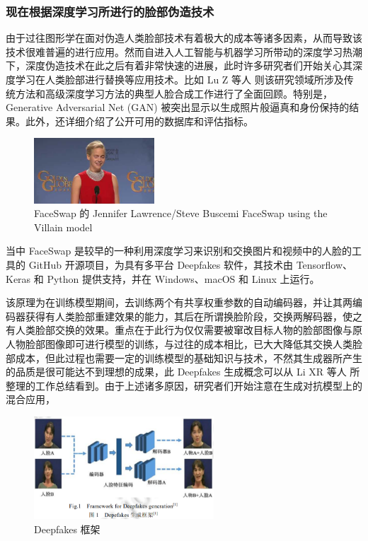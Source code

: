 \subsubsection{现在根据深度学习所进行的脸部伪造技术}

由于过往图形学在面对伪造人类脸部技术有着极大的成本等诸多因素，从而导致该技术很难普遍的进行应用。然而自进入人工智能与机器学习所带动的深度学习热潮下，深度伪造技术在此之后有着非常快速的进展，此时许多研究者们开始关心其深度学习在人类脸部进行替换等应用技术。比如 Lu Z 等人 \cite{lu2017recent}则该研究领域所涉及传统方法和高级深度学习方法的典型人脸合成工作进行了全面回顾。特别是，Generative Adversarial Net (GAN) 被突出显示以生成照片般逼真和身份保持的结果。此外，还详细介绍了公开可用的数据库和评估指标。

\begin{figure}[htb]
\centering 
\includegraphics[width=0.40\textwidth]{img/ch1m7.png} 
\caption{FaceSwap 的 Jennifer Lawrence/Steve Buscemi FaceSwap using the Villain model}
\label{Test}
\end{figure}

当中 FaceSwap \cite{list1101} 是较早的一种利用深度学习来识别和交换图片和视频中的人脸的工具的 GitHub 开源项目，为具有多平台 Deepfakes 软件，其技术由 Tensorflow、Keras 和 Python 提供支持，并在 Windows、macOS 和 Linux 上运行。

该原理为在训练模型期间，去训练两个有共享权重参数的自动编码器，并让其两编码器获得有人类脸部重建效果的能力，其后在所谓换脸阶段，交换两解码器，使之有人类脸部交换的效果。重点在于此行为仅仅需要被窜改目标人物的脸部图像与原人物脸部图像即可进行模型的训练，与过往的成本相比，已大大降低其交换人类脸部成本，但此过程也需要一定的训练模型的基础知识与技术，不然其生成器所产生的品质是很可能达不到理想的成果，此 Deepfakes 生成概念可以从 Li XR 等人 \cite{2021496}所整理的工作总结看到。由于上述诸多原因，研究者们开始注意在生成对抗模型上的混合应用，

\begin{figure}[htb]
\centering 
\includegraphics[width=0.60\textwidth]{img/ch1m8.png} 
\caption{Deepfakes 框架}
\label{Test}
\end{figure}

